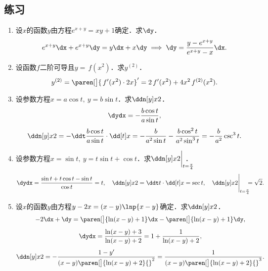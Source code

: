 \ifshowex
{}
\subsection*{练习}

\begin{enumerate}
\item 设\(x\)的函数\(y\)由方程\(e^{x+y} = xy + 1\)确定．求\(\dy\)．
  \ifshowsol
  \begin{equation*}
    e^{x+y} \dx + e^{x+y} \dy
    = y \dx + x \dy
    \implies
    \dy = \frac{y-e^{x+y}}{e^{x+y}-x} \dx.
  \end{equation*}
  \fi

\item 设函数\(f\)二阶可导且\(y = \,f(x^2)\)．求\(y^{(2)}\)．
  \ifshowsol
  \begin{equation*}
    y^{(2)}
    = \paren[\big]{\,f'(x^2) \cdot 2x}'
    = 2\,f'(x^2) + 4x^2\,f^{(2)}(x^2).
  \end{equation*}
  \fi

\item 设参数方程\(x = a \cos t,\ y = b \sin t\)．求\(\ddn[y]x2\)．
  \ifshowsol
  \begin{gather*}
    \dydx = - \frac{b \cos t}{a \sin t}, \\[1ex]
    \ddn[y]x2
    = - \ddt \frac{b \cos t}{a \sin t} \cdot \dd[t]x
    = - \frac{b}{a^2 \sin t} - \frac{b \cos^2 t}{a^2 \sin^3 t}
    = - \frac{b}{a^2} \csc^3 t.
  \end{gather*}
  \fi

\item 设参数方程\(x = \sin t,\ y = t \sin t + \cos t\)．求\(\ddn[y]x2 \bigg\vert_{t=\frac\pi4}\mkern-24mu\)．
  \ifshowsol
  \begin{equation*}
    \dydx = \frac{\sin t + t \cos t - \sin t}{\cos t} = t,
    \quad
    \ddn[y]x2 = \ddt t \cdot \dd[t]x = \sec t,
    \quad
    \ddn[y]x2 \Bigg\vert_{t=\frac\pi4} \mkern-11mu = \sqrt2.
  \end{equation*}
  \fi

\item 设\(x\)的函数\(y\)由方程\(y - 2x = (x-y) \lnp{x-y}\)确定．求\(\ddn[y]x2\)．
  \ifshowsol
  \begin{gather*}
    -2\dx + \dy
    = \paren[\big]{\ln(x-y) + 1} \dx - \paren[\big]{\ln(x-y) + 1} \dy, \\[1ex]
    \dydx = \frac{\ln(x-y)+3}{\ln(x-y)+2} = 1 + \frac{1}{\ln(x-y)+2}, \\[1ex]
    \ddn[y]x2
    = - \frac{1-y'}{(x-y)\paren[\big]{\ln(x-y)+2}{}^2}
    = \frac{1}{(x-y)\paren[\big]{\ln(x-y)+2}{}^3}.
  \end{gather*}
  \fi


\end{enumerate}
